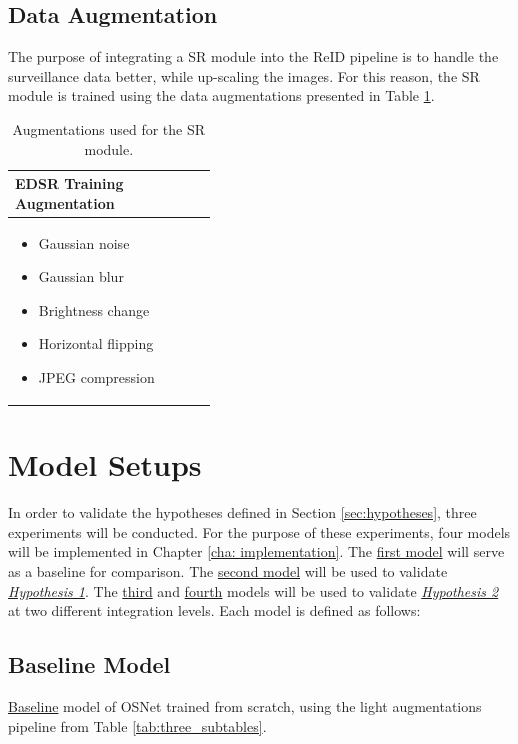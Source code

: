 \subsection{Data Augmentation}
The purpose of integrating a \acs{SR} module into the \acs{ReID} pipeline is to handle the surveillance data better, while up-scaling the images. For this reason, the \acs{SR} module is trained using the data augmentations presented in Table \ref{tab:edsraugmentation}.

\begin{table}[H]
\centering
\begin{tabular}{|>{\centering\arraybackslash}p{0.4\linewidth}|}
\hline
\cellcolor[HTML]{D8E9F7}\textbf{EDSR Training Augmentation}\\ \hline
\begin{itemize}[leftmargin=45pt, topsep=0pt, itemsep=0pt]
    \item Gaussian noise
    \item Gaussian blur
    \item Brightness change
    \item Horizontal flipping
\item JPEG compression
    \vspace{1em}
\end{itemize}\\ \hline
\end{tabular}
\caption{Augmentations used for the \acs{SR} module.}
\label{tab:edsraugmentation}
\end{table}

\section{Model Setups} \label{sec:model_definitions}

In order to validate the hypotheses defined in Section \ref{sec:hypotheses}, three experiments will be conducted. For the purpose of these experiments, four models will be implemented in Chapter \ref{cha: implementation}. The \hyperlink{model:baseline}{first model} will serve as a baseline for comparison. The \hyperlink{model:augmented}{second model} will be used to validate \hyperlink{hypothesis:1}{\textit{Hypothesis 1}}. The \hyperlink{model:sequential}{third} and \hyperlink{model:endtoend}{fourth} models will be used to validate \hyperlink{hypothesis:2}{\textit{Hypothesis 2}} at two different integration levels. Each model is defined as follows:

\subsection*{\hypertarget{model:baseline}{Baseline} Model}
\hyperlink{model:baseline}{Baseline} model of \acs{OSNet} trained from scratch, using the light augmentations pipeline from Table \ref{tab:three_subtables}.

